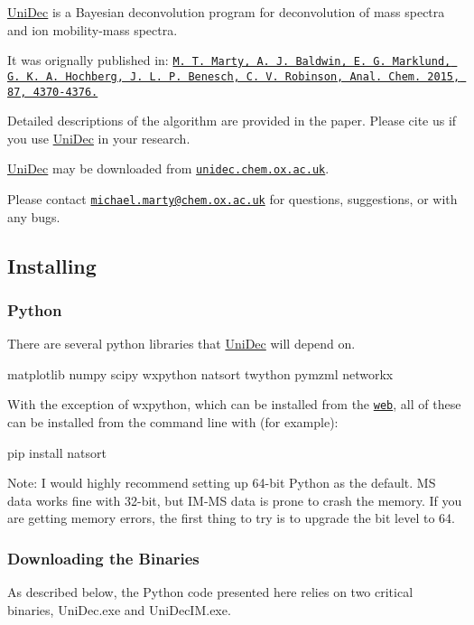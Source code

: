 \hyperlink{namespace_uni_dec}{Uni\+Dec} is a Bayesian deconvolution program for deconvolution of mass spectra and ion mobility-\/mass spectra.

It was orignally published in\+: \href{http://pubs.acs.org/doi/abs/10.1021/acs.analchem.5b00140}{\tt M. T. Marty, A. J. Baldwin, E. G. Marklund, G. K. A. Hochberg, J. L. P. Benesch, C. V. Robinson, Anal. Chem. 2015, 87, 4370-\/4376.}

Detailed descriptions of the algorithm are provided in the paper. Please cite us if you use \hyperlink{namespace_uni_dec}{Uni\+Dec} in your research.

\hyperlink{namespace_uni_dec}{Uni\+Dec} may be downloaded from \href{http://unidec.chem.ox.ac.uk/}{\tt unidec.\+chem.\+ox.\+ac.\+uk}.

Please contact \href{mailto:michael.marty@chem.ox.ac.uk}{\tt michael.\+marty@chem.\+ox.\+ac.\+uk} for questions, suggestions, or with any bugs.

\subsection*{Installing}

\subsubsection*{Python}

There are several python libraries that \hyperlink{namespace_uni_dec}{Uni\+Dec} will depend on.

matplotlib numpy scipy wxpython natsort twython pymzml networkx

With the exception of wxpython, which can be installed from the \href{http://wxpython.org/}{\tt web}, all of these can be installed from the command line with (for example)\+: \begin{DoxyVerb}pip install natsort
\end{DoxyVerb}


Note\+: I would highly recommend setting up 64-\/bit Python as the default. M\+S data works fine with 32-\/bit, but I\+M-\/\+M\+S data is prone to crash the memory. If you are getting memory errors, the first thing to try is to upgrade the bit level to 64.

\subsubsection*{Downloading the Binaries}

As described below, the Python code presented here relies on two critical binaries, Uni\+Dec.\+exe and Uni\+Dec\+I\+M.\+exe.

